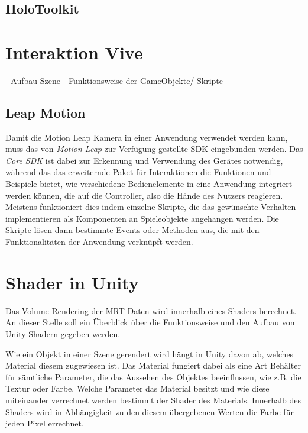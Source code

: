 \subsection{HoloToolkit}

\section{Interaktion Vive}
\label{3dscene}

- Aufbau Szene
- Funktionsweise der GameObjekte/ Skripte

\subsection{Leap Motion}

Damit die Motion Leap Kamera in einer Anwendung verwendet werden kann, muss das von \textit{Motion Leap} zur Verfügung gestellte SDK eingebunden werden. Das \textit{Core SDK} ist dabei zur Erkennung und Verwendung des Gerätes notwendig, während das das erweiternde Paket für Interaktionen die Funktionen und Beispiele bietet, wie verschiedene Bedienelemente in eine Anwendung integriert werden können, die auf die Controller, also die Hände des Nutzers reagieren.
Meistens funktioniert dies indem einzelne Skripte, die das gewünschte Verhalten implementieren als Komponenten an Spieleobjekte angehangen werden. Die Skripte lösen dann bestimmte Events oder Methoden aus, die mit den Funktionalitäten der Anwendung verknüpft werden. 

\section{Shader in Unity}

Das Volume Rendering der MRT-Daten wird innerhalb eines Shaders berechnet. An dieser Stelle soll ein Überblick über die Funktionsweise und den Aufbau von Unity-Shadern gegeben werden. 

Wie ein Objekt in einer Szene gerendert wird hängt in Unity davon ab, welches Material diesem zugewiesen ist. Das Material fungiert dabei als eine Art Behälter für sämtliche Parameter, die das Aussehen des Objektes beeinflussen, wie z.B. die Textur oder Farbe. Welche Parameter das Material besitzt und wie diese miteinander verrechnet werden bestimmt der Shader des Materials. Innerhalb des Shaders wird in Abhängigkeit zu den diesem übergebenen Werten die Farbe für jeden Pixel errechnet. 

